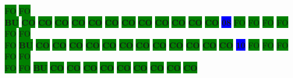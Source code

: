 \colorbox{green}{\color[gray]{0.75}FO}%
\colorbox{green}{\color[gray]{0.75}FO}%
\\
\colorbox{green}{\color[rgb]{1,0,0}\textbf{BU}}%
\colorbox{green}{\color[rgb]{0,0,0}\textbf{CO}}%
\colorbox{green}{\color[rgb]{0,0,0}\textbf{CO}}%
\colorbox{green}{\color[rgb]{0,0,0}\textbf{CO}}%
\colorbox{green}{\color[rgb]{0,0,0}\textbf{CO}}%
\colorbox{green}{\color[rgb]{0,0,0}\textbf{CO}}%
\colorbox{green}{\color[rgb]{0,0,0}\textbf{CO}}%
\colorbox{green}{\color[rgb]{0,0,0}\textbf{CO}}%
\colorbox{green}{\color[rgb]{0,0,0}\textbf{CO}}%
\colorbox{green}{\color[rgb]{0,0,0}\textbf{CO}}%
\colorbox{green}{\color[rgb]{0,0,0}\textbf{CO}}%
\colorbox{green}{\color[rgb]{0,0,0}\textbf{CO}}%
\colorbox{green}{\color[rgb]{0,0,0}\textbf{CO}}%
\colorbox{blue}{\color[rgb]{1,0,0}\textbf{08}}%
\colorbox{green}{\color[gray]{0.75}FO}%
\colorbox{green}{\color[gray]{0.75}FO}%
\colorbox{green}{\color[gray]{0.75}FO}%
\colorbox{green}{\color[gray]{0.75}FO}%
\colorbox{green}{\color[gray]{0.75}FO}%
\colorbox{green}{\color[gray]{0.75}FO}%
\\
\colorbox{green}{\color[gray]{0.75}FO}%
\colorbox{green}{\color[rgb]{1,0,0}\textbf{BU}}%
\colorbox{green}{\color[rgb]{0,0,0}\textbf{CO}}%
\colorbox{green}{\color[rgb]{0,0,0}\textbf{CO}}%
\colorbox{green}{\color[rgb]{0,0,0}\textbf{CO}}%
\colorbox{green}{\color[rgb]{0,0,0}\textbf{CO}}%
\colorbox{green}{\color[rgb]{0,0,0}\textbf{CO}}%
\colorbox{green}{\color[rgb]{0,0,0}\textbf{CO}}%
\colorbox{green}{\color[rgb]{0,0,0}\textbf{CO}}%
\colorbox{green}{\color[rgb]{0,0,0}\textbf{CO}}%
\colorbox{green}{\color[rgb]{0,0,0}\textbf{CO}}%
\colorbox{green}{\color[rgb]{0,0,0}\textbf{CO}}%
\colorbox{green}{\color[rgb]{0,0,0}\textbf{CO}}%
\colorbox{green}{\color[rgb]{0,0,0}\textbf{CO}}%
\colorbox{blue}{\color[rgb]{1,0,0}\textbf{10}}%
\colorbox{green}{\color[gray]{0.75}FO}%
\colorbox{green}{\color[gray]{0.75}FO}%
\colorbox{green}{\color[gray]{0.75}FO}%
\colorbox{green}{\color[gray]{0.75}FO}%
\colorbox{green}{\color[gray]{0.75}FO}%
\\
\colorbox{green}{\color[gray]{0.75}FO}%
\colorbox{green}{\color[gray]{0.75}FO}%
\colorbox{green}{\color[rgb]{1,0,0}\textbf{BU}}%
\colorbox{green}{\color[rgb]{0,0,0}\textbf{CO}}%
\colorbox{green}{\color[rgb]{0,0,0}\textbf{CO}}%
\colorbox{green}{\color[rgb]{0,0,0}\textbf{CO}}%
\colorbox{green}{\color[rgb]{0,0,0}\textbf{CO}}%
\colorbox{green}{\color[rgb]{0,0,0}\textbf{CO}}%
\colorbox{green}{\color[rgb]{0,0,0}\textbf{CO}}%
\colorbox{green}{\color[rgb]{0,0,0}\textbf{CO}}%
\colorbox{green}{\color[rgb]{0,0,0}\textbf{CO}}%
\colorbox{green}{\color[rgb]{0,0,0}\textbf{CO}}%
